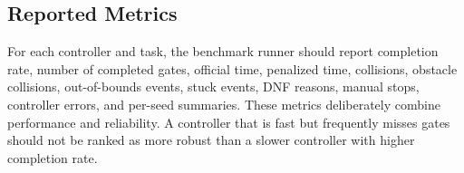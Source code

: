 \subsection{Reported Metrics}

For each controller and task, the benchmark runner should report completion rate, number of completed gates, official time, penalized time, collisions, obstacle collisions, out-of-bounds events, stuck events, DNF reasons, manual stops, controller errors, and per-seed summaries. These metrics deliberately combine performance and reliability. A controller that is fast but frequently misses gates should not be ranked as more robust than a slower controller with higher completion rate.

